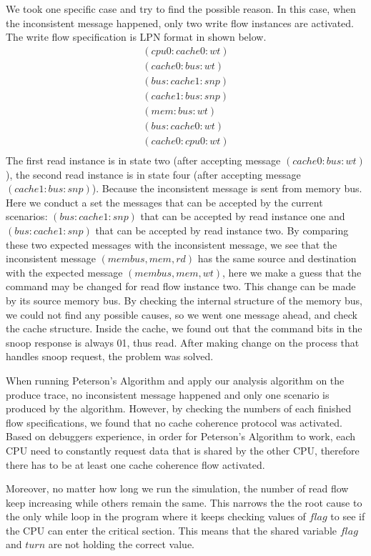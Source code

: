 \documentclass[12pt,frontmatter,copyright,thesis]{usfmanus}
\begin{document}
We took one specific case and try to find the possible reason.
In this case, when the inconsistent message happened, only two write flow instances
are activated. The write flow specification is LPN format in shown below.
\[
\begin{array}{l}
(cpu0: cache0: wt)\\
(cache0: bus: wt)\\
(bus: cache1: snp)\\
(cache1: bus: snp)\\
(mem: bus: wt)\\
(bus: cache0: wt)\\
(cache0: cpu0: wt)\\
\end{array}
\]
The first read instance is in state two (after accepting message $(cache0: bus: wt)$),
the second read instance is in state four (after accepting message $(cache1: bus: snp)$).
Because the inconsistent message is sent from memory bus. Here we conduct a set
the messages that can be accepted by the current scenarios: $(bus: cache1: snp)$ that can be accepted
by read instance one and $(bus: cache1: snp)$ that can be accepted by
read instance two. By comparing these two expected messages with
the inconsistent message, we see that the inconsistent message
$(membus, mem, rd)$ has the same source and destination with
the expected message $(membus, mem, wt)$, here we make
a guess that
the command may be changed for read flow instance two. This change
can be made by its source memory bus. By checking the internal structure
of the memory bus, we could not find any possible causes, so we went one
message ahead, and check the cache structure. Inside the cache,
we found out that the command bits in the snoop response
is always 01, thus read. After making change on the
process that handles snoop request, the problem was solved.




When running Peterson's Algorithm and apply our analysis algorithm on
the produce trace, no inconsistent message happened and only one scenario is produced
by the algorithm.
However, by checking the numbers of each finished flow specifications,
we found that no cache coherence protocol was activated. Based on debuggers experience, in order for Peterson's Algorithm to work, each CPU
need to constantly request data that is shared by the other CPU,
therefore there has to be at least one cache 
coherence flow activated.

Moreover,
no matter how long we run the simulation, the number of read flow keep increasing while
others remain the same.
This narrows the the root cause to
the only while loop in the program where it
keeps checking values of $flag$ to see
if the CPU can enter the critical section. 
This means that the
shared variable $flag$ and $turn$ are not holding the correct value.
\end{document}
